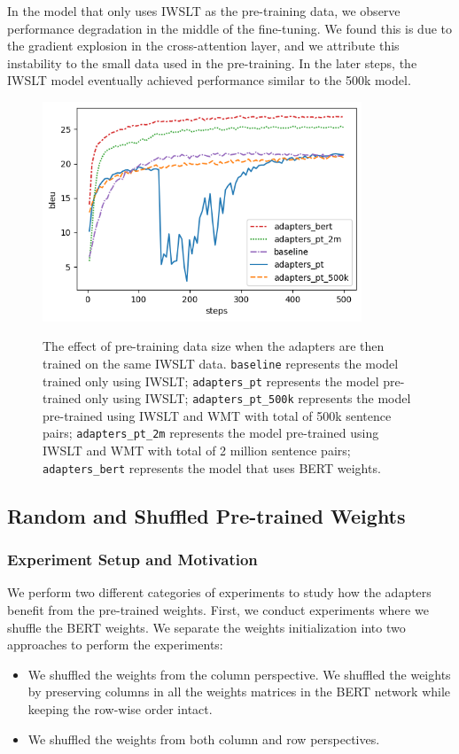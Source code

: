 In the model that only uses IWSLT as the pre-training data, we observe performance degradation in the middle of the fine-tuning. We found this is due to the gradient explosion in the cross-attention layer, and we attribute this instability to the small data used in the pre-training. In the later steps, the IWSLT model eventually achieved performance similar to the 500k model.
\begin{figure}[h]
    {\includegraphics[width=0.85\textwidth]{img/adapterscomparison.png}}
    \centering
    \caption[The effect of pre-training data size when the adapters are then trained on the same IWSLT data.]{
        The effect of pre-training data size when the adapters are then trained on the same IWSLT data. \texttt{baseline} represents the model trained only using IWSLT; \texttt{adapters\_pt} represents the model pre-trained only using IWSLT; \texttt{adapters\_pt\_500k} represents the model pre-trained using IWSLT and WMT with total of 500k sentence pairs; \texttt{adapters\_pt\_2m} represents the model pre-trained using IWSLT and WMT with total of 2 million sentence pairs; \texttt{adapters\_bert} represents the model that uses BERT weights.}
    \label{img:adpcomp}
\end{figure}

\subsection{Random and Shuffled Pre-trained Weights}
\label{ssec:randshuff}
\subsubsection{Experiment Setup and Motivation}
We perform two different categories of experiments to study how the adapters benefit from the pre-trained weights.
First, we conduct experiments where we shuffle the BERT weights. We separate the weights initialization into two approaches to perform the experiments:
\begin{itemize}
    \item We shuffled the weights from the column perspective. We shuffled the weights by preserving columns in all the weights matrices in the BERT network while keeping the row-wise order intact.
    \item We shuffled the weights from both column and row perspectives.
\end{itemize}


